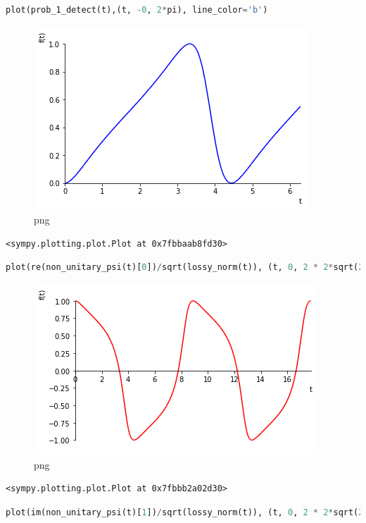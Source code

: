 \begin{lstlisting}[language=Python]
plot(prob_1_detect(t),(t, -0, 2*pi), line_color='b')
\end{lstlisting}

\begin{figure}
\centering
\includegraphics[width=0.66\linewidth]{output_34_0.png}
\caption[]{png}
\end{figure}

\begin{lstlisting}
<sympy.plotting.plot.Plot at 0x7fbbaab8fd30>
\end{lstlisting}

\begin{lstlisting}[language=Python]
plot(re(non_unitary_psi(t)[0])/sqrt(lossy_norm(t)), (t, 0, 2 * 2*sqrt(2)*pi), line_color='r')
\end{lstlisting}

\begin{figure}
\centering
\includegraphics[width=0.66\linewidth]{output_35_0.png}
\caption[]{png}
\end{figure}

\begin{lstlisting}
<sympy.plotting.plot.Plot at 0x7fbbb2a02d30>
\end{lstlisting}

\begin{lstlisting}[language=Python]
plot(im(non_unitary_psi(t)[1])/sqrt(lossy_norm(t)), (t, 0, 2 * 2*sqrt(2)*pi), line_color='b')
\end{lstlisting}

